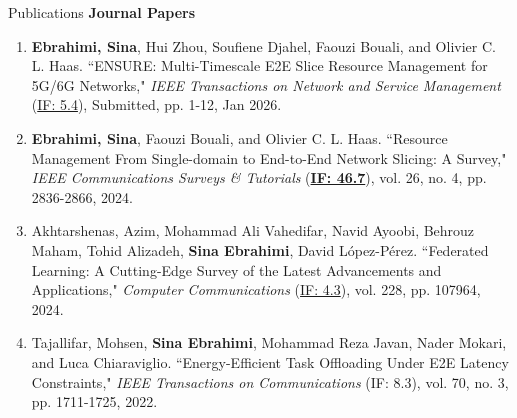 \documentclass{resume}
\begin{document}
\begin{rSection}{Publications}
	\textbf{Journal Papers}
        \setcounter{revnum}{4} %
	\begin{enumerate}[label=\arabic{revnum}., left=-4.5mm] %
          \item  \textbf{Ebrahimi, Sina}, Hui Zhou, Soufiene Djahel, Faouzi Bouali, and Olivier C. L. Haas. ``ENSURE: Multi-Timescale E2E Slice Resource Management for 5G/6G Networks," \textit{IEEE Transactions on Network and Service Management} (\underline{IF: 5.4}), Submitted, pp. 1-12, Jan 2026. \href{https://ieeexplore.ieee.org/xpl/RecentIssue.jsp?punumber=4275028}{} \href{}{}	
          \addtocounter{revnum}{-1} %
          \item  \textbf{Ebrahimi, Sina}, Faouzi Bouali, and Olivier C. L. Haas. ``Resource Management From Single-domain to End-to-End Network Slicing: A Survey," \textit{IEEE Communications Surveys \& Tutorials} (\underline{\textbf{IF: 46.7}}), vol. 26, no. 4, pp. 2836-2866, 2024. \href{https://ieeexplore.ieee.org/xpl/RecentIssue.jsp?punumber=9739}{} \href{https://doi.org/10.1109/COMST.2024.3390613}{}	
          \addtocounter{revnum}{-1}
          \item  Akhtarshenas, Azim, Mohammad Ali Vahedifar, Navid Ayoobi, Behrouz Maham, Tohid Alizadeh, \textbf{Sina Ebrahimi}, David López-Pérez. ``Federated Learning: A Cutting-Edge Survey of the Latest Advancements and Applications," \textit{Computer Communications} (\underline{IF: 4.3}), vol. 228, pp. 107964, 2024. \href{https://www.sciencedirect.com/journal/computer-communications/about/insights}{} \href{https://doi.org/10.1016/j.comcom.2024.107964}{}	%
          \addtocounter{revnum}{-1}
          \item Tajallifar, Mohsen, \textbf{Sina Ebrahimi}, Mohammad Reza Javan, Nader Mokari, and Luca Chiaraviglio. ``Energy-Efficient Task Offloading Under E2E Latency Constraints," \textit{IEEE Transactions on Communications} (IF: 8.3), vol. 70, no. 3, pp. 1711-1725, 2022. \href{https://ieeexplore.ieee.org/xpl/RecentIssue.jsp?punumber=26}{} \href{https://github.com/sinaebrahimi/task-offloading}{} \href{https://doi.org/10.1109/TCOMM.2021.3132909}{}	

\end{enumerate}
\end{rSection}
\end{document}
